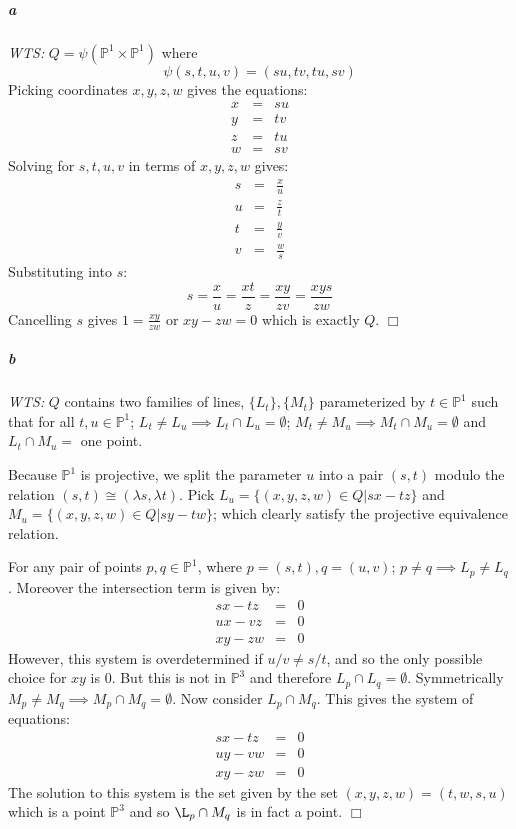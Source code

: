\documentclass{article}
\begin{document}
\subparagraph{a}
\emph{WTS:} $Q = \psi( \mathbb{P}^1 \times \mathbb{P}^1 )$ where
\[ \psi(s, t, u, v) = (s u, t v, t u, s v) \]
Picking coordinates $x,y,z,w$ gives the equations:
\begin{eqnarray*}
x & = & s u \\
y & = & t v \\
z & = & t u \\
w & = & s v 
\end{eqnarray*}
Solving for $s,t,u,v$ in terms of $x,y,z,w$ gives:
\begin{eqnarray*}
s & = & \frac{x}{u} \\
u & = & \frac{z}{t} \\
t & = & \frac{y}{v} \\
v & = & \frac{w}{s}
\end{eqnarray*}
Substituting into $s$:
\[ s = \frac{x}{u} = \frac{x t}{z} = \frac{x y}{z v} = \frac{x y s}{z w} \]
Cancelling $s$ gives $1 = \frac{xy}{zw}$ or $xy - zw = 0$ which is exactly $Q$. $\Box$

\subparagraph{b}

\emph{WTS:} $Q$ contains two families of lines, $\{ L_t \}, \{ M_t \}$ parameterized by $t \in \mathbb{P}^1$ such that for all $t,u \in \mathbb{P}^1$; $L_t \neq L_u \implies L_t \cap L_u = \emptyset$; $M_t \neq M_u \implies M_t \cap M_u = \emptyset$ and $L_t \cap M_u = $ one point.

Because $\mathbb{P}^1$ is projective, we split the parameter $u$ into a pair $(s,t)$ modulo the relation $(s,t) \cong (\lambda s, \lambda t)$. Pick $L_u = \{ (x,y,z,w) \in Q | sx - tz \}$ and $M_u = \{ (x,y,z,w) \in Q | sy - tw \}$; which clearly satisfy the projective equivalence relation.  

For any pair of points $p,q \in \mathbb{P}^1$, where $p = (s,t), q = (u,v)$; $p \neq q \implies L_p \neq L_q$. Moreover the intersection term is given by:  
\begin{eqnarray*}
sx - tz & = & 0 \\
ux - vz & = & 0 \\
xy - zw & = & 0
\end{eqnarray*}
However, this system is overdetermined if $u/v \neq s/t$, and so the only possible choice for $xy$ is 0.  But this is not in $\mathbb{P}^3$ and therefore $L_p \cap L_q = \emptyset$.  Symmetrically $M_p \neq M_q \implies M_p \cap M_q = \emptyset$.  Now consider $L_p \cap M_q$.  This gives the system of equations:
\begin{eqnarray*}
sx - tz & = & 0 \\
uy - vw & = & 0 \\
xy - zw & = & 0
\end{eqnarray*}
The solution to this system is the set given by the set $(x,y,z,w) = (t, w, s, u)$ which is a point $\mathbb{P}^3$ and so $\L_p \cap M_q$ is in fact a point. $\Box$
\end{document}
